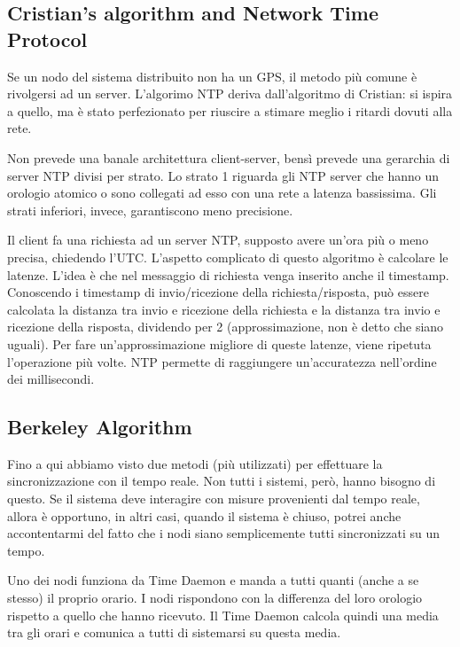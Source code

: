 \subsection{Cristian’s algorithm and Network Time Protocol}

Se un nodo del sistema distribuito non ha un GPS, il metodo più comune è rivolgersi ad un server. L'algorimo NTP deriva dall'algoritmo di Cristian: si ispira a quello, ma è stato perfezionato per riuscire a stimare meglio i ritardi dovuti alla rete. 

Non prevede una banale architettura client-server, bensì prevede una gerarchia di server NTP divisi per strato. Lo strato 1 riguarda gli NTP server che hanno un orologio atomico o sono collegati ad esso con una rete a latenza bassissima. Gli strati inferiori, invece, garantiscono meno precisione. 

Il client fa una richiesta ad un server NTP, supposto avere un'ora più o meno precisa, chiedendo l'UTC. L'aspetto complicato di questo algoritmo è calcolare le latenze.  L'idea è che nel messaggio di richiesta venga inserito anche il timestamp. Conoscendo i timestamp di invio/ricezione della richiesta/risposta, può essere calcolata la distanza tra invio e ricezione della richiesta e la distanza tra invio e ricezione della risposta, dividendo per 2 (approssimazione, non è detto che siano uguali). Per fare un'approssimazione migliore di queste latenze, viene ripetuta l'operazione più volte. NTP permette di raggiungere un'accuratezza nell'ordine dei millisecondi.

\subsection{Berkeley Algorithm}

Fino a qui abbiamo visto due metodi (più utilizzati) per effettuare la sincronizzazione con il tempo reale. Non tutti i sistemi, però, hanno bisogno di questo. Se il sistema deve interagire con misure provenienti dal tempo reale, allora è opportuno, in altri casi, quando il sistema è chiuso, potrei anche accontentarmi del fatto che i nodi siano semplicemente tutti sincronizzati su un tempo.

Uno dei nodi funziona da Time Daemon e manda a tutti quanti (anche a se stesso) il proprio orario. I nodi rispondono con la differenza del loro orologio rispetto a quello che hanno ricevuto. Il Time Daemon calcola quindi una media tra gli orari e comunica a tutti di sistemarsi su questa media. 

